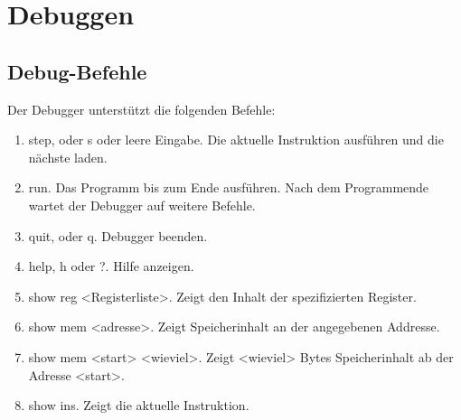 \section{Debuggen}

\subsection{Debug-Befehle}

Der Debugger unterstützt die folgenden Befehle:

\begin{enumerate}
 \item step, oder s oder leere Eingabe. 
       Die aktuelle Instruktion ausführen und die nächste laden.
 \item run. Das Programm bis zum Ende ausführen. Nach dem Programmende wartet
       der Debugger auf weitere Befehle.
 \item quit, oder q. Debugger beenden.
 \item help, h oder ?. Hilfe anzeigen.
 \item show reg <Registerliste>. Zeigt den Inhalt der spezifizierten Register.
 \item show mem <adresse>. Zeigt Speicherinhalt an der angegebenen Addresse.
 \item show mem <start> <wieviel>. Zeigt <wieviel> Bytes Speicherinhalt ab
       der Adresse <start>.
 \item show ins. Zeigt die aktuelle Instruktion.
\end{enumerate}

